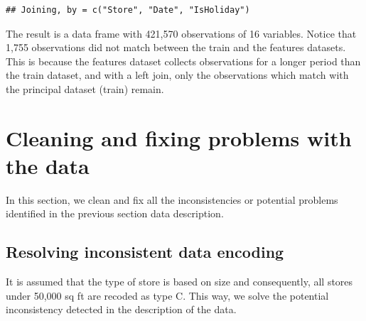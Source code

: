 \documentclass[11pt,]{article}
\newenvironment{Shaded}{\begin{snugshade}}{\end{snugshade}}
\newcommand{\DataTypeTok}[1]{\textcolor[rgb]{0.13,0.29,0.53}{{#1}}}
\newcommand{\DecValTok}[1]{\textcolor[rgb]{0.00,0.00,0.81}{{#1}}}
\newcommand{\StringTok}[1]{\textcolor[rgb]{0.31,0.60,0.02}{{#1}}}
\newcommand{\CommentTok}[1]{\textcolor[rgb]{0.56,0.35,0.01}{\textit{{#1}}}}
\newcommand{\NormalTok}[1]{{#1}}
\begin{document}
\begin{verbatim}
## Joining, by = c("Store", "Date", "IsHoliday")
\end{verbatim}

The result is a data frame with 421,570 observations of 16 variables.
Notice that 1,755 observations did not match between the train and the
features datasets. This is because the features dataset collects
observations for a longer period than the train dataset, and with a left
join, only the observations which match with the principal dataset
(train) remain.

\section{Cleaning and fixing problems with the
data}\label{cleaning-and-fixing-problems-with-the-data}

In this section, we clean and fix all the inconsistencies or potential
problems identified in the previous section data description.

\subsection{Resolving inconsistent data
encoding}\label{resolving-inconsistent-data-encoding}

It is assumed that the type of store is based on size and consequently,
all stores under 50,000 sq ft are recoded as type C. This way, we solve
the potential inconsistency detected in the description of the data.

\begin{Shaded}
\end{Shaded}
\end{document}
